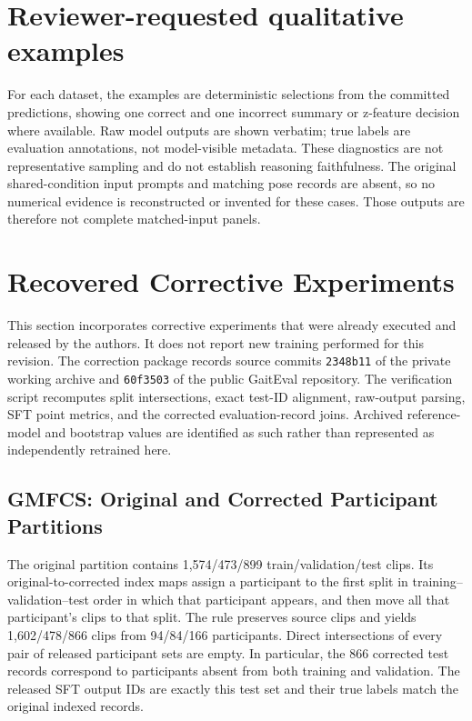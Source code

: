 \section{Reviewer-requested qualitative examples}

For each dataset, the examples are deterministic selections from the committed predictions, showing one correct and one incorrect summary or z-feature decision where available. Raw model outputs are shown verbatim; true labels are evaluation annotations, not model-visible metadata. These diagnostics are not representative sampling and do not establish reasoning faithfulness. The original shared-condition input prompts and matching pose records are absent, so no numerical evidence is reconstructed or invented for these cases. Those outputs are therefore not complete matched-input panels.

\clearpage
\section{Recovered Corrective Experiments}
\label{sec:supp_recovered_corrections}

This section incorporates corrective experiments that were already executed and released by the authors. It does not report new training performed for this revision. The correction package records source commits \texttt{2348b11} of the private working archive and \texttt{60f3503} of the public GaitEval repository. The verification script recomputes split intersections, exact test-ID alignment, raw-output parsing, SFT point metrics, and the corrected evaluation-record joins. Archived reference-model and bootstrap values are identified as such rather than represented as independently retrained here.

\subsection{GMFCS: Original and Corrected Participant Partitions}
The original partition contains 1,574/473/899 train/validation/test clips. Its original-to-corrected index maps assign a participant to the first split in training--validation--test order in which that participant appears, and then move all that participant's clips to that split. The rule preserves source clips and yields 1,602/478/866 clips from 94/84/166 participants. Direct intersections of every pair of released participant sets are empty. In particular, the 866 corrected test records correspond to participants absent from both training and validation. The released SFT output IDs are exactly this test set and their true labels match the original indexed records.

